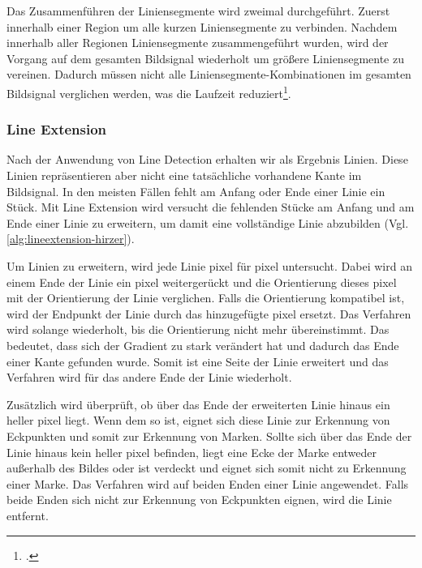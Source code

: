 Das Zusammenführen der Liniensegmente wird zweimal durchgeführt. Zuerst innerhalb einer Region um alle kurzen
 Liniensegmente zu verbinden. Nachdem innerhalb aller Regionen Liniensegmente zusammengeführt wurden, wird der Vorgang
 auf dem gesamten Bildsignal wiederholt um größere Liniensegmente zu vereinen. Dadurch müssen nicht alle
 Liniensegmente-Kombinationen im gesamten Bildsignal verglichen werden, was die Laufzeit
 reduziert\footcite[Vgl.][S.~10]{hirzer08}.


\subsubsection{Line Extension} %
\label{sub:line_extension}



Nach der Anwendung von Line Detection erhalten wir als Ergebnis Linien. Diese Linien repräsentieren aber nicht eine
 tatsächliche vorhandene Kante im Bildsignal. In den meisten Fällen fehlt am Anfang oder Ende einer Linie ein Stück.
 Mit Line Extension wird versucht die fehlenden Stücke am Anfang und am Ende einer Linie zu erweitern, um damit eine
 vollständige Linie abzubilden (Vgl. \autoref{alg:lineextension-hirzer}).

Um Linien zu erweitern, wird jede Linie \gls{pixel} für \gls{pixel} untersucht. Dabei wird an einem Ende der Linie
 ein \gls{pixel} weitergerückt und die Orientierung dieses \gls{pixel} mit der Orientierung der Linie verglichen. Falls
 die Orientierung kompatibel ist, wird der Endpunkt der Linie durch das hinzugefügte \gls{pixel} ersetzt. Das Verfahren
 wird solange wiederholt, bis die Orientierung nicht mehr übereinstimmt. Das bedeutet, dass sich der Gradient zu stark
 verändert hat und dadurch das Ende einer Kante gefunden wurde. Somit ist eine Seite der Linie erweitert und das
 Verfahren wird für das andere Ende der Linie wiederholt.

Zusätzlich wird überprüft, ob über das Ende der erweiterten Linie hinaus ein heller \gls{pixel} liegt. Wenn dem so ist,
 eignet sich diese Linie zur Erkennung von Eckpunkten und somit zur Erkennung von Marken. Sollte sich über das Ende der
 Linie hinaus kein heller \gls{pixel} befinden, liegt eine Ecke der Marke entweder außerhalb des Bildes oder ist
 verdeckt und eignet sich somit nicht zu Erkennung einer Marke. Das Verfahren wird auf beiden Enden einer Linie
 angewendet. Falls beide Enden sich nicht zur Erkennung von Eckpunkten eignen, wird die Linie entfernt.

